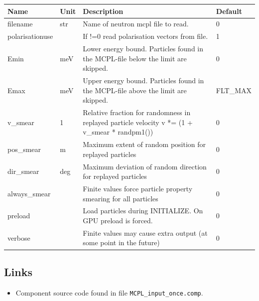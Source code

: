 \begin{longtable}{p{}p{}p{}p{}}
\toprule
\textbf{Name} & \textbf{Unit} & \textbf{Description} & \textbf{Default} \\
\midrule
\endhead
filename & str & Name of neutron mcpl file to read. & 0 \\
polarisationuse &   & If !=0 read polarisation vectors from file. & 1 \\
Emin & meV & Lower energy bound. Particles found in the MCPL-file below the limit are skipped. & 0 \\
Emax & meV & Upper energy bound. Particles found in the MCPL-file above the limit are skipped. & FLT\_MAX \\
v\_smear & 1 & Relative fraction for randomness in replayed particle velocity v *= (1 + v\_smear * randpm1()) & 0 \\
pos\_smear & m & Maximum extent of random position for replayed particles & 0 \\
dir\_smear & deg & Maximum deviation of random direction for replayed particles & 0 \\
always\_smear &   & Finite values force particle property smearing for all particles & 0 \\
preload &   & Load particles during INITIALIZE. On GPU preload is forced. & 0 \\
verbose &   & Finite values may cause extra output (at some point in the future) & 0 \\
\bottomrule
\end{longtable}

\subsection*{Links}
\begin{itemize}
  \item Component source code found in file \texttt{MCPL\_input\_once.comp}.
\end{itemize}
